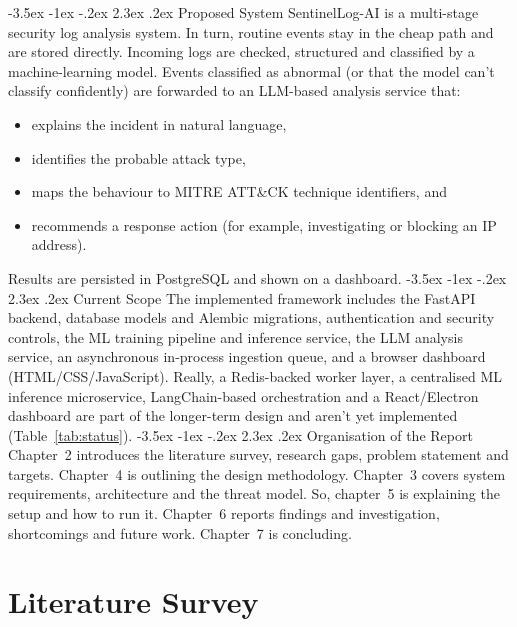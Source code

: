 \documentclass[12pt,a4paper]{report}
\makeatletter
\renewcommand\section{\@startsection {section}{1}{\z@}%
  {-3.5ex \@plus -1ex \@minus -.2ex}%
  {2.3ex \@plus .2ex}%
  {\normalfont\fontsize{17}{21}\selectfont\bfseries}}
\makeatother
\begin{document}
\section{Proposed System}
SentinelLog-AI is a multi-stage security log analysis system. In turn, routine events stay in the cheap path and are stored directly. Incoming logs are checked, structured and classified by a machine-learning model. Events classified as abnormal (or that the model can't classify confidently) are forwarded to an LLM-based analysis service that:
\begin{itemize}[nosep]
  \item explains the incident in natural language,
  \item identifies the probable attack type,
  \item maps the behaviour to MITRE ATT\&CK technique identifiers, and
  \item recommends a response action (for example, investigating or blocking an IP address).
\end{itemize}
Results are persisted in PostgreSQL and shown on a dashboard.
\section{Current Scope}
The implemented framework includes the FastAPI backend, database models and Alembic migrations, authentication and security controls, the ML training pipeline and inference service, the LLM analysis service, an asynchronous in-process ingestion queue, and a browser dashboard (HTML/CSS/JavaScript). Really, a Redis-backed worker layer, a centralised ML inference microservice, LangChain-based orchestration and a React/Electron dashboard are part of the longer-term design and aren't yet implemented (Table~\ref{tab:status}).
\section{Organisation of the Report}
Chapter~2 introduces the literature survey, research gaps, problem statement and targets. Chapter~4 is outlining the design methodology. Chapter~3 covers system requirements, architecture and the threat model. So, chapter~5 is explaining the setup and how to run it. Chapter~6 reports findings and investigation, shortcomings and future work. Chapter~7 is concluding.

\chapter{Literature Survey}
\end{document}
